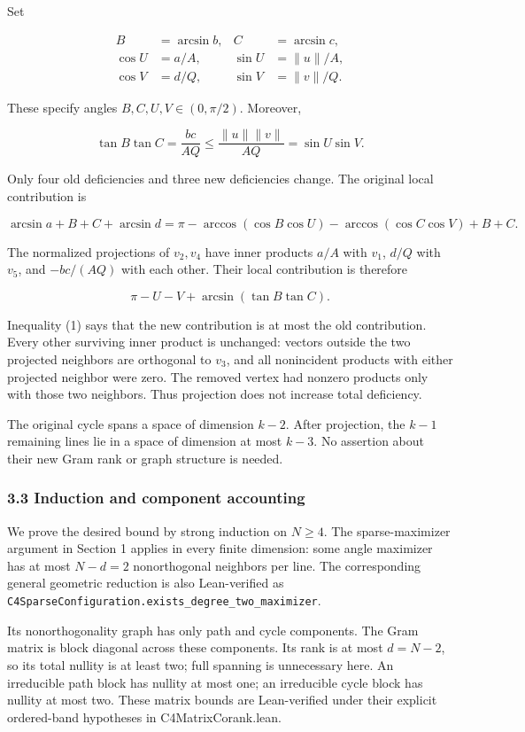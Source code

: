 \documentclass[11pt,a4paper]{article}
\begin{document}
Set

\[
\begin{aligned}B&=\arcsin b,&C&=\arcsin c,\\\cos U&=a/A,&\sin U&=\|u\|/A,\\\cos V&=d/Q,&\sin V&=\|v\|/Q.\end{aligned}
\]

These specify angles \(B,C,U,V\in(0,\pi/2)\). Moreover,

\[
\tan B\tan C=\frac{bc}{AQ}\le\frac{\|u\|\|v\|}{AQ}=\sin U\sin V.
\]

Only four old deficiencies and three new deficiencies change. The original local contribution is

\[
\arcsin a+B+C+\arcsin d=\pi-\arccos(\cos B\cos U)-\arccos(\cos C\cos V)+B+C.
\]

The normalized projections of \(v_2,v_4\) have inner products \(a/A\) with \(v_1\), \(d/Q\) with \(v_5\), and \(-bc/(AQ)\) with each other. Their local contribution is therefore

\[
\pi-U-V+\arcsin(\tan B\tan C).
\]

Inequality (1) says that the new contribution is at most the old contribution. Every other surviving inner product is unchanged: vectors outside the two projected neighbors are orthogonal to \(v_3\), and all nonincident products with either projected neighbor were zero. The removed vertex had nonzero products only with those two neighbors. Thus projection does not increase total deficiency.

The original cycle spans a space of dimension \(k-2\). After projection, the \(k-1\) remaining lines lie in a space of dimension at most \(k-3\). No assertion about their new Gram rank or graph structure is needed.

\subsubsection{3.3 Induction and component accounting}\label{induction-and-component-accounting}

We prove the desired bound by strong induction on \(N\ge4\). The sparse-maximizer argument in Section 1 applies in every finite dimension: some angle maximizer has at most \(N-d=2\) nonorthogonal neighbors per line. The corresponding general geometric reduction is also Lean-verified as \texttt{C4SparseConfiguration.exists\_degree\_two\_maximizer}.

Its nonorthogonality graph has only path and cycle components. The Gram matrix is block diagonal across these components. Its rank is at most \(d=N-2\), so its total nullity is at least two; full spanning is unnecessary here. An irreducible path block has nullity at most one; an irreducible cycle block has nullity at most two. These matrix bounds are Lean-verified under their explicit ordered-band hypotheses in C4MatrixCorank.lean.
\end{document}

